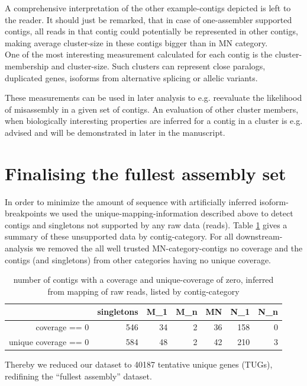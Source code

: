\documentclass[12pt,a4paper]{article}
\begin{document}
A comprehensive interpretation of the other example-contigs depicted
is left to the reader. It should just be remarked, that in case of
one-assembler supported contigs, all reads in that contig could
potentially be represented in other contigs, making average
cluster-size in these contigs bigger than in MN category.\\

One of the most interesting measurement calculated for each contig is
the cluster-membership and cluster-size. Such clusters can represent
close paralogs, duplicated genes, isoforms from alternative splicing
or allelic variants.

These measurements can be used in later analysis to e.g. reevaluate
the likelihood of misassembly in a given set of contigs. An evaluation
of other cluster members, when biologically interesting properties are
inferred for a contig in a cluster is e.g. advised and will be
demonstrated in later in the manuscript.


\section{Finalising the fullest assembly set}
\label{sec:final-full-assembly}

In order to minimize the amount of sequence with artificially inferred
isoform-breakpoints we used the unique-mapping-information described
above to detect contigs and singletons not supported by any raw data
(reads). Table \ref{tab:cov.ex} gives a summary of these unsupported
data by contig-category. For all downstream-analysis we removed the
all well trusted MN-category-contigs no coverage and the contigs (and
singletons) from other categories having no unique coverage.

\begin{table}[ht]
\begin{center}
\begin{tabular}{rrrrrrr}
  \hline
 & singletons & M\_1 & M\_n & MN & N\_1 & N\_n \\ 
  \hline
coverage == 0 & 546 &  34 &   2 &  36 & 158 &   0 \\ 
  unique coverage == 0 & 584 &  48 &   2 &  42 & 210 &   3 \\ 
   \hline
\end{tabular}
\caption{number of contigs with a coverage and unique-coverage of zero, inferred from mapping of raw reads, listed by contig-category}
\label{tab:cov.ex}
\end{center}
\end{table}
Thereby we reduced our dataset to 40187 tentative
unique genes (TUGs), redifining the ``fullest assembly'' dataset.
\end{document}
